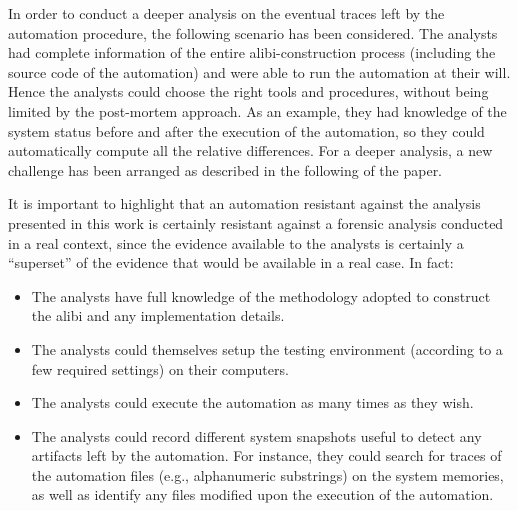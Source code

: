 \documentclass[10pt, conference]{IEEEtran}
\begin{document}

In order to conduct a deeper analysis on the eventual traces left by the automation procedure, the following scenario has been considered.
The analysts had complete information of the entire alibi-construction process (including the source code of the automation) and were able
to run the automation at their will. Hence the analysts could choose the right tools and procedures, without being limited by the post-mortem
approach. As an example, they had knowledge of the system status before and after the execution of the automation, so they could
automatically compute all the relative differences. For a deeper analysis, a new challenge has been arranged as described in the following
of the paper.


It is important to highlight that an automation resistant against the analysis presented in this work is certainly resistant against a forensic
analysis conducted in a real context, since the evidence available to the analysts is certainly a ``superset'' of the evidence that would be
available in a real case. In fact:
\begin{itemize}
 \item The analysts have full knowledge of the methodology adopted to construct the alibi and any implementation details.
 \item The analysts could themselves setup the testing environment (according to a few required settings) on their computers.
 \item The analysts could execute the automation as many times as they wish.
 \item The analysts could record different system snapshots useful to detect any artifacts left by the automation. For instance, they
 could search for traces of the automation files (e.g., alphanumeric substrings) on the system memories, as well as identify any files
 modified upon the execution of the automation.
\end{itemize}
\end{document}
